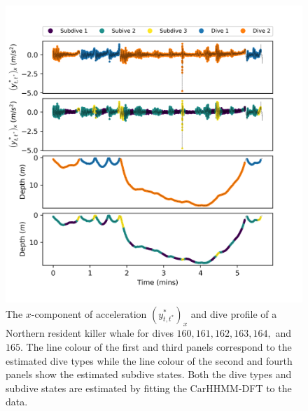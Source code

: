 \begin{figure}[ht]
	\centering
	\includegraphics[width=5in]{../Plots/CarHHMM2_decoded_dives.png}
	\caption{The $x$-component of acceleration $\left(y^*_{t,t^*}\right)_x$ and dive profile of a Northern resident killer whale for dives $160,161,162,163,164,$ and $165$. The line colour of the first and third panels correspond to the estimated dive types while the line colour of the second and fourth panels show the estimated subdive states. Both the dive types and subdive states are estimated by fitting the CarHHMM-DFT to the data.}
	\label{fig:labeled_dives}
\end{figure}


